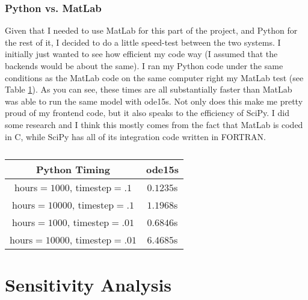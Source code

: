 \documentclass[]{article}
\begin{document}
		\subsubsection{Python vs. MatLab}
		Given that I needed to use MatLab for this part of the project, and Python for the rest of it, I decided to do a little speed-test between the two systems. I initially just wanted to see how efficient my code way (I assumed that the backends would be about the same). I ran my Python code under the same conditions as the MatLab code on the same computer right my MatLab test (see Table \ref{tab:pytiming}). As you can see, these times are all substantially faster than MatLab was able to run the same model with ode15s. Not only does this make me pretty proud of my frontend code, but it also speaks to the efficiency of SciPy. I did some research and I think this mostly comes from the fact that MatLab is coded in C, while SciPy has all of its integration code written in FORTRAN.

		\begin{table}[h]
			\centering
			\begin{tabular}{|c|c|}
				\hline
				Python Timing & ode15s \\ \hline
				hours$=1000$, timestep$=.1$ & $0.1235$s  \\ \hline
				hours$=10000$, timestep$=.1$ & $1.1968$s \\ \hline
				hours$=1000$, timestep$=.01$ & $0.6846$s \\ \hline
				hours$=10000$, timestep$=.01$ & $6.4685$s \\ \hline
			\end{tabular}
			\caption{}
			\label{tab:pytiming}
		\end{table}

	\section{Sensitivity Analysis}
\end{document}
